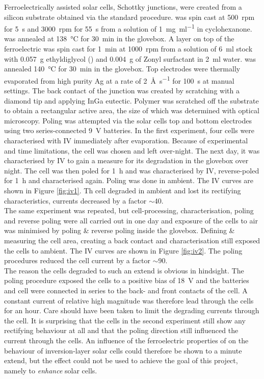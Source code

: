 Ferroelectrically assisted solar cells, \ie{} Schottky junctions, were created from a silicon substrate obtained via the standard procedure. \pvdf{} was spin cast at \SI{500}{rpm} for \SI{5}{\second} and \SI{3000}{rpm} for \SI{55}{\second} from a solution of \SI{1}{\milli\gram\per\milli\litre} \pvdf{} in cyclohexanone. \pvdf{} was annealed at \SI{138}{\degreeCelsius} for \SI{30}{\minute} in the glovebox. A \pdot{} layer on top of the ferroelectric was spin cast for \SI{1}{\minute} at \SI{1000}{rpm} from a solution of \SI{6}{\milli\litre} \pdot{} stock with \SI{0.057}{\gram} ethyldiglycol (\edg{}) and \SI{0.004}{\gram} of Zonyl surfactant in \SI{2}{\milli\litre} water. \pdot{} was annealed \SI{140}{\degreeCelsius} for \SI{30}{\minute} in the glovebox. Top electrodes were thermally evaporated from high purity Ag at a rate of \SI{2}{\angstrom\per\second} for \SI{100}{\second} at manual settings. The back contact of the junction was created by scratching with a diamond tip and applying InGa eutectic. Polymer was scratched off the substrate to obtain a rectangular active area, the size of which was determined with optical microscopy. Poling was attempted via the solar cells top and bottom electrodes using two series-connected \SI{9}{\volt} batteries. In the first experiment, four cells were characterised with IV immediately after evaporation. Because of experimental and time limitations, the  cell was chosen and left over-night. The next day, it was characterised by IV to gain a measure for its degradation in the glovebox over night. The cell was then poled for \SI{1}{\hour} and was characterised by IV, reverse-poled for \SI{1}{\hour} and characterised again. Poling was done in ambient. The IV curves are shown in Figure \ref{fig:iv1}. Th cell degraded in ambient and lost its rectifying characteristics, currents decreased by a factor $\sim$40.\\
The same experiment was repeated, but cell-processing, characterisation, poling and reverse poling were all carried out in one day and exposure of the cells to air was minimised by poling \& reverse poling inside the glovebox. Defining \& measuring the cell area, creating a back contact and characterisation still exposed the cells to ambient. The IV curves are shown in Figure \ref{fig:iv2}. The poling procedures reduced the cell current by a factor $\sim$90.\\
The reason the cells degraded to such an extend is obvious in hindsight. The poling procedure exposed the cells to a positive bias of \SI{18}{\volt} and the batteries and cell were connected in series to the back- and front contacts of the cell. A constant current of relative high magnitude was therefore lead through the cells for an hour. Care should have been taken to limit the degrading currents through the cell. It is surprising that the  cells in the second experiment still show any rectifying behaviour at all and that the poling direction still influenced the current through the cells. An influence of the ferroelectric properties of \pvdf{} on the behaviour of inversion-layer solar cells could therefore be shown to a minute extend, but the effect could not be used to achieve the goal of this project, namely to \emph{enhance} solar cells.  

